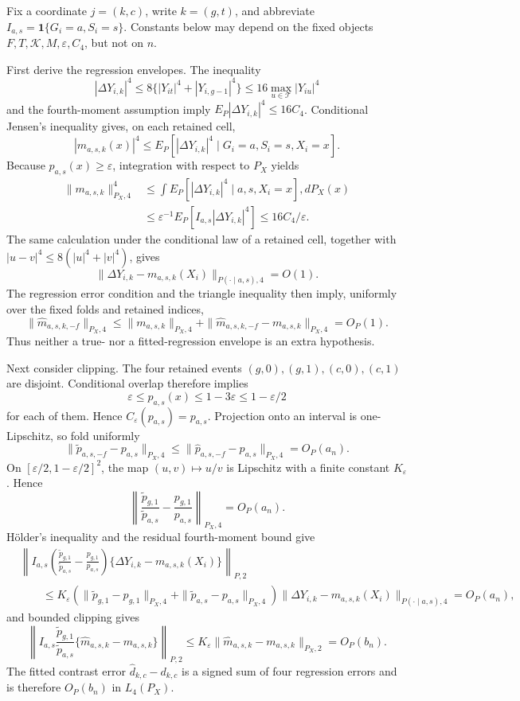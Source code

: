 Fix a coordinate \(j=(k,c)\), write \(k=(g,t)\), and abbreviate \(I_{a,s}=\mathbf 1\{G_i=a,S_i=s\}\).  Constants below may depend on the fixed objects \(F,T,\mathcal K,M,\varepsilon,C_4\), but not on \(n\).

First derive the regression envelopes.  The inequality
\[
 |\Delta Y_{i,k}|^4
 \le 8\{|Y_{it}|^4+|Y_{i,g-1}|^4\}
 \le16\max_{u\in\mathcal T}|Y_{iu}|^4
\]
and the fourth-moment assumption imply \(E_P|\Delta Y_{i,k}|^4\le16C_4\).  Conditional Jensen's inequality gives, on each retained cell,
\[
 |m_{a,s,k}(x)|^4
 \le E_P[|\Delta Y_{i,k}|^4\mid G_i=a,S_i=s,X_i=x].
\]
Because \(p_{a,s}(x)\ge\varepsilon\), integration with respect to \(P_X\) yields
\[
\begin{aligned}
 \|m_{a,s,k}\|_{P_X,4}^4
 &\le \int E_P[|\Delta Y_{i,k}|^4\mid a,s,X_i=x],dP_X(x)\\
 &\le \varepsilon^{-1}E_P[I_{a,s}|\Delta Y_{i,k}|^4]
 \le16C_4/\varepsilon.
\end{aligned}
\]
The same calculation under the conditional law of a retained cell, together with \(|u-v|^4\le8(|u|^4+|v|^4)\), gives
\[
 \|\Delta Y_{i,k}-m_{a,s,k}(X_i)\|_{P(\cdot\mid a,s),4}=O(1).
\]
The regression error condition and the triangle inequality then imply, uniformly over the fixed folds and retained indices,
\[
 \|\widehat m_{a,s,k,-f}\|_{P_X,4}
 \le \|m_{a,s,k}\|_{P_X,4}
 +\|\widehat m_{a,s,k,-f}-m_{a,s,k}\|_{P_X,4}
 =O_P(1).
\]
Thus neither a true- nor a fitted-regression envelope is an extra hypothesis.

Next consider clipping.  The four retained events \((g,0),(g,1),(c,0),(c,1)\) are disjoint.  Conditional overlap therefore implies
\[
 \varepsilon\le p_{a,s}(x)\le1-3\varepsilon
 \le1-\varepsilon/2
\]
for each of them.  Hence \(C_\varepsilon(p_{a,s})=p_{a,s}\).  Projection onto an interval is one-Lipschitz, so fold uniformly
\[
 \|\widetilde p_{a,s,-f}-p_{a,s}\|_{P_X,4}
 \le\|\widehat p_{a,s,-f}-p_{a,s}\|_{P_X,4}=O_P(a_n).
\]
On \([\varepsilon/2,1-\varepsilon/2]^2\), the map \((u,v)\mapsto u/v\) is Lipschitz with a finite constant \(K_\varepsilon\).  Hence
\[
 \left\|\frac{\widetilde p_{g,1}}{\widetilde p_{a,s}}
       -\frac{p_{g,1}}{p_{a,s}}\right\|_{P_X,4}=O_P(a_n).
\]
Hölder's inequality and the residual fourth-moment bound give
\[
\begin{aligned}
 &\left\|I_{a,s}\left(
 \frac{\widetilde p_{g,1}}{\widetilde p_{a,s}}
 -\frac{p_{g,1}}{p_{a,s}}\right)
 \{\Delta Y_{i,k}-m_{a,s,k}(X_i)\}\right\|_{P,2}\\
 &\qquad\le K_\varepsilon\left(
 \|\widetilde p_{g,1}-p_{g,1}\|_{P_X,4}
 +\|\widetilde p_{a,s}-p_{a,s}\|_{P_X,4}\right)
 \|\Delta Y_{i,k}-m_{a,s,k}(X_i)\|_{P(\cdot\mid a,s),4}
 =O_P(a_n),
\end{aligned}
\]
and bounded clipping gives
\[
 \left\|I_{a,s}\frac{\widetilde p_{g,1}}{\widetilde p_{a,s}}
 \{\widehat m_{a,s,k}-m_{a,s,k}\}\right\|_{P,2}
 \le K_\varepsilon\|\widehat m_{a,s,k}-m_{a,s,k}\|_{P_X,2}
 =O_P(b_n).
\]
The fitted contrast error \(\widehat d_{k,c}-d_{k,c}\) is a signed sum of four regression errors and is therefore \(O_P(b_n)\) in \(L_4(P_X)\).


